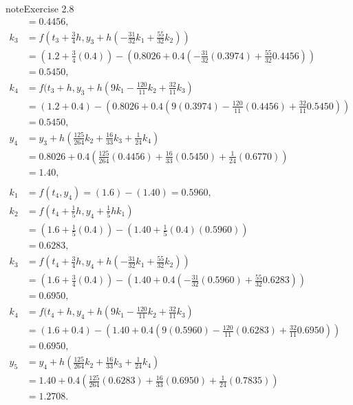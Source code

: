 \documentclass[letterpaper,10pt,english]{jupyterBook}
\begin{document}
\begin{sphinxadmonition}{note}{Exercise 2.8}
\begin{align*}
    &= 0.4456, \\
    k_3 &= f(t_3 + \tfrac{3}{4}h, y_3 + h(-\tfrac{31}{32}k_1 + \tfrac{55}{32}k_2)) \\
    &= (1.2 + \tfrac{3}{4}(0.4)) - (0.8026 + 0.4(-\tfrac{31}{32}(0.3974) + \tfrac{55}{32}0.4456)) \\
    &= 0.5450, \\
    k_4 &= f(t_3 + h, y_3 + h(9k_1 - \tfrac{120}{11}k_2 + \tfrac{32}{11}k_3) \\
    &= (1.2 + 0.4) - (0.8026 + 0.4(9(0.3974) - \tfrac{120}{11}(0.4456) + \tfrac{32}{11}0.5450)) \\
    &= 0.5450, \\
    y_4 &= y_3 + h\left( \tfrac{125}{264} k_2 + \tfrac{16}{33} k_3 + \tfrac{1}{24} k_4 \right) \\
    &= 0.8026 + 0.4 \left( \tfrac{125}{264} (0.4456) + \tfrac{16}{33} (0.5450) + \tfrac{1}{24} (0.6770) \right) \\
    &= 1.40, \\
    \\
    k_1 &= f(t_4, y_4) = (1.6) - (1.40) = 0.5960, \\
    k_2 &= f(t_4 + \tfrac{1}{5}h, y_4 + \tfrac{1}{5}hk_1) \\
    &= (1.6 + \tfrac{1}{5}(0.4)) - (1.40 + \tfrac{1}{5}(0.4)(0.5960)) \\
    &= 0.6283, \\
    k_3 &= f(t_4 + \tfrac{3}{4}h, y_4 + h(-\tfrac{31}{32}k_1 + \tfrac{55}{32}k_2)) \\
    &= (1.6 + \tfrac{3}{4}(0.4)) - (1.40 + 0.4(-\tfrac{31}{32}(0.5960) + \tfrac{55}{32}0.6283)) \\
    &= 0.6950, \\
    k_4 &= f(t_4 + h, y_4 + h(9k_1 - \tfrac{120}{11}k_2 + \tfrac{32}{11}k_3) \\
    &= (1.6 + 0.4) - (1.40 + 0.4(9(0.5960) - \tfrac{120}{11}(0.6283) + \tfrac{32}{11}0.6950)) \\
    &= 0.6950, \\
    y_5 &= y_4 + h\left( \tfrac{125}{264} k_2 + \tfrac{16}{33} k_3 + \tfrac{1}{24} k_4 \right) \\
    &= 1.40 + 0.4 \left( \tfrac{125}{264} (0.6283) + \tfrac{16}{33} (0.6950) + \tfrac{1}{24} (0.7835) \right) \\
    &= 1.2708.
\end{align*}\end{sphinxadmonition}
\end{document}
